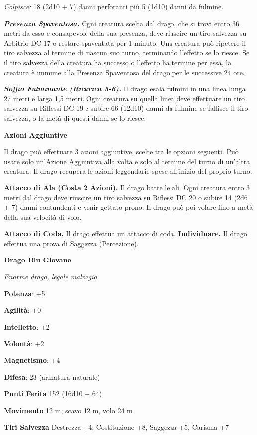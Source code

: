 \begin{multicols}{2}
\emph{Colpisce:} 18 (2d10 + 7) danni perforanti più 5 (1d10) danni da
fulmine.

\emph{\textbf{Presenza Spaventosa.}} Ogni creatura scelta dal drago, che
si trovi entro 36 metri da esso e consapevole della sua presenza, deve
riuscire un tiro salvezza su Arbitrio DC 17 o restare spaventata per 1
minuto. Una creatura può ripetere il tiro salvezza al termine di ciascun
suo turno, terminando l'effetto se lo riesce. Se il tiro salvezza della
creatura ha successo o l'effetto ha termine per essa, la creatura è
immune alla Presenza Spaventosa del drago per le successive 24 ore.

\emph{\textbf{Soffio Fulminante (Ricarica 5-6).}} Il drago esala fulmini
in una linea lunga 27 metri e larga 1,5 metri. Ogni creatura su quella
linea deve effettuare un tiro salvezza su Riflessi DC 19 e subire 66
(12d10) danni da fulmine se fallisce il tiro salvezza, o la metà di
questi danni se lo riesce.

\textbf{Azioni Aggiuntive}

Il drago può effettuare 3 azioni aggiuntive, scelte tra le opzioni
seguenti. Può usare solo un'Azione Aggiuntiva alla volta e solo al
termine del turno di un'altra creatura. Il drago recupera le azioni
leggendarie spese all'inizio del proprio turno.

\textbf{Attacco di Ala (Costa 2 Azioni).} Il drago batte le ali. Ogni
creatura entro 3 metri dal drago deve riuscire un tiro salvezza su Riflessi DC 20 o subire 14 (2d6 + 7) danni contundenti e venir gettato
prono. Il drago può poi volare fino a metà della sua velocità di volo.

\textbf{Attacco di Coda.} Il drago effettua un attacco di coda.
\textbf{Individuare.} Il drago effettua una prova di Saggezza
(Percezione).

\textbf{Drago Blu Giovane}

\emph{Enorme drago, legale malvagio}

\textbf{Potenza}: +5

\textbf{Agilità}: +0

\textbf{Intelletto}: +2

\textbf{Volontà}: +2

\textbf{Magnetismo}: +4

\textbf{Difesa}: 23 (armatura naturale)

\textbf{Punti Ferita} 152 (16d10 + 64)

\textbf{Movimento} 12 m, scavo 12 m, volo 24 m

\textbf{Tiri Salvezza} Destrezza +4, Costituzione +8, Saggezza +5,
Carisma +7


\end{multicols}
